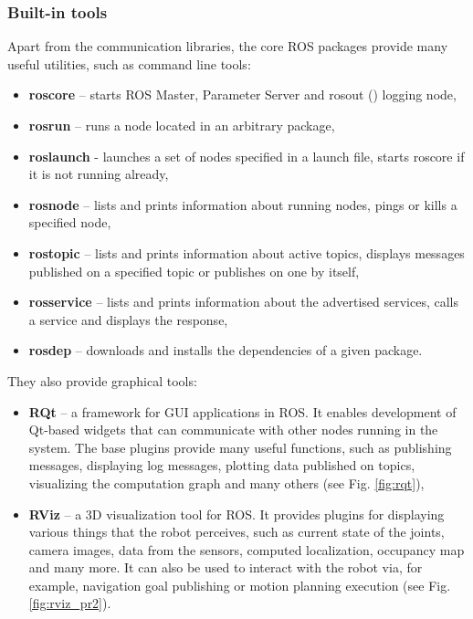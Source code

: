 \documentclass[english,inz,shortabstract]{iithesis}
\begin{document}
\pagebreak

		\subsubsection{Built-in tools}
		Apart from the communication libraries, the core ROS packages provide many useful utilities, such as command line tools:

		\begin{itemize}[itemsep=0pt, parsep=2pt, topsep=0pt]
			\item \textbf{roscore} -- starts ROS Master, Parameter Server and \textsf{rosout} (\cite{ros:rosout}) logging node,
			\item \textbf{rosrun} -- runs a node located in an arbitrary package,
			\item \textbf{roslaunch} - launches a set of nodes specified in a launch file, starts roscore if it is not running already,
			\item \textbf{rosnode} -- lists and prints information about running nodes, pings or kills a specified node,
			\item \textbf{rostopic} -- lists and prints information about active topics, displays messages published on a specified topic or publishes on one by itself,
			\item \textbf{rosservice} -- lists and prints information about the advertised services, calls a service and displays the response,
			\item \textbf{rosdep} -- downloads and installs the dependencies of a given package.
		\end{itemize}
		They also provide graphical tools:

		\begin{itemize}[itemsep=0pt, parsep=2pt, topsep=0pt]
			\item \textbf{RQt} -- a framework for GUI applications in ROS. It enables development of Qt-based widgets that can communicate with other nodes running in the system. The base plugins provide many useful functions, such as publishing messages, displaying log messages, plotting data published on topics, visualizing the computation graph and many others (see Fig. \ref{fig:rqt}),
			\item \textbf{RViz} -- a 3D visualization tool for ROS. It provides plugins for displaying various things that the robot perceives, such as current state of the joints, camera images, data from the sensors, computed localization, occupancy map and many more. It can also be used to interact with the robot via, for example, navigation goal publishing or motion planning execution (see Fig. \ref{fig:rviz_pr2}).
		\end{itemize}
\end{document}
